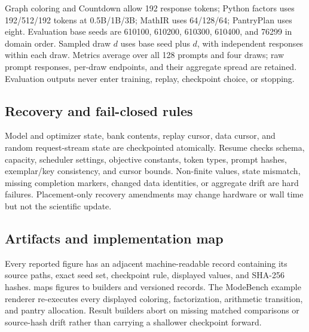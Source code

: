 \documentclass{article}
\newcommand{\1}{\mathbf 1}
\theoremstyle{remark}
\theoremstyle{definition}
\theoremstyle{plain}
\begin{document}
Graph coloring and Countdown allow 192 response tokens; Python factors uses
192/512/192 tokens at 0.5B/1B/3B; MathIR uses 64/128/64; PantryPlan uses eight.
Evaluation base seeds are 610100, 610200, 610300, 610400, and 76299 in domain
order. Sampled draw $d$ uses base seed plus $d$, with independent responses
within each draw. Metrics average over all 128 prompts and four draws; raw
prompt responses, per-draw endpoints, and their aggregate spread are retained.
Evaluation outputs never enter training, replay, checkpoint choice, or stopping.

\subsection{Recovery and fail-closed rules}
\label{app:repro-recovery}

Model and optimizer state, bank contents, replay cursor, data cursor, and random
request-stream state are checkpointed atomically. Resume checks schema,
capacity, scheduler settings, objective constants, token types, prompt hashes,
exemplar/key consistency, and cursor bounds. Non-finite values, state mismatch,
missing completion markers, changed data identities, or aggregate drift are
hard failures. Placement-only recovery amendments may change hardware or wall
time but not the scientific update.

\subsection{Artifacts and implementation map}
\label{app:repro-artifacts}
\label{app:repro-code}

Every reported figure has an adjacent machine-readable record containing its
source paths, exact seed set, checkpoint rule, displayed values, and SHA-256
hashes.  maps figures to builders and versioned
records. The ModeBench example renderer re-executes every displayed coloring,
factorization, arithmetic transition, and pantry allocation. Result builders
abort on missing matched comparisons or source-hash drift rather than carrying a
shallower checkpoint forward.
\end{document}
